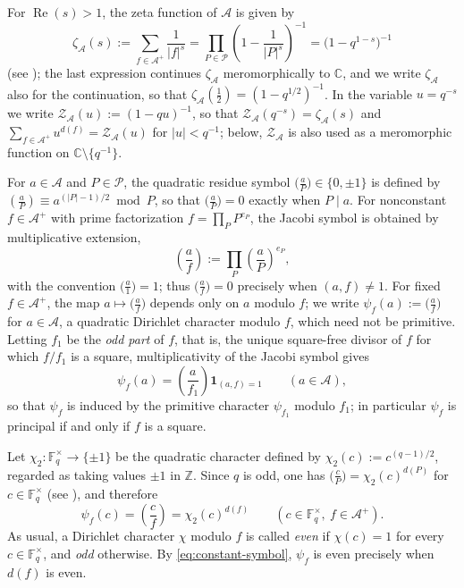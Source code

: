 \documentclass[a4paper,reqno]{amsart}
\numberwithin{equation}{section}
\theoremstyle{remark}
\theoremstyle{definition}
\newcommand{\A}{\mathcal{A}}
\begin{document}
For $\operatorname{Re}(s)>1$, the zeta function of $\A$ is given by
$$
\zeta_{\A}(s):=\sum_{f\in\A^+}\frac{1}{|f|^{s}}
=\prod_{P\in\mathcal P}\left(1-\frac{1}{|P|^{s}}\right)^{-1}
=\bigl(1-q^{1-s}\bigr)^{-1}
$$
(see \cite[Chapter~2]{Ro02}); the last expression continues $\zeta_\A$
meromorphically to $\mathbb C$, and we write $\zeta_\A$ also for the
continuation, so that $\zeta_\A(\tfrac12)=(1-q^{1/2})^{-1}$. In the variable
$u=q^{-s}$ we write $\mathcal Z_{\A}(u):=(1-qu)^{-1}$, so that
$\mathcal Z_{\A}(q^{-s})=\zeta_{\A}(s)$ and
$\sum_{f\in\A^+}u^{d(f)}=\mathcal Z_\A(u)$ for $|u|<q^{-1}$; below,
$\mathcal Z_\A$ is also used as a meromorphic function on
$\mathbb C\setminus\{q^{-1}\}$.

For $a\in\A$ and $P\in\mathcal{P}$, the quadratic residue symbol
$\bigl(\frac{a}{P}\bigr)\in\{0,\pm1\}$ is defined by
$\left(\frac{a}{P}\right)\equiv a^{(|P|-1)/2}\bmod P$,
so that $\bigl(\frac{a}{P}\bigr)=0$ exactly when $P\mid a$. For
nonconstant $f\in\A^+$ with prime factorization $f=\prod_PP^{e_P}$, the
Jacobi symbol is obtained by multiplicative extension,
$$
\left(\frac{a}{f}\right):=\prod_P\left(\frac{a}{P}\right)^{e_P},
$$
with the convention $\bigl(\frac{a}{1}\bigr)=1$; thus
$\bigl(\frac{a}{f}\bigr)=0$ precisely when $(a,f)\ne1$. For fixed
$f\in\A^+$, the map $a\mapsto\bigl(\frac{a}{f}\bigr)$ depends only on
$a$ modulo $f$; we write $\psi_f(a):=\bigl(\frac{a}{f}\bigr)$ for $a\in\A$, a
quadratic Dirichlet character modulo $f$, which need not be primitive.
Letting $f_1$ be the \emph{odd part} of $f$, that is, the unique square-free
divisor of $f$ for which $f/f_1$ is a square, multiplicativity of the Jacobi
symbol gives
\begin{equation}\label{eq:psi-induced}
\psi_f(a)=\left(\frac{a}{f_1}\right)\mathbf 1_{(a,f)=1}
\qquad(a\in\A),
\end{equation}
so that $\psi_f$ is induced by the primitive character $\psi_{f_1}$ modulo
$f_1$; in particular $\psi_f$ is principal if and only if $f$ is a square.

Let $\chi_2:\mathbb F_q^\times\to\{\pm1\}$ be the quadratic character
defined by $\chi_2(c):=c^{(q-1)/2}$, regarded as taking values $\pm1$ in $\mathbb Z$.
Since $q$ is odd, one has $\bigl(\frac{c}{P}\bigr)=\chi_2(c)^{d(P)}$ for
$c\in\mathbb F_q^\times$ (see \cite[Chapter~3]{Ro02}), and therefore
\begin{equation}\label{eq:constant-symbol}
\psi_f(c)=\left(\frac{c}{f}\right)=\chi_2(c)^{d(f)}
\qquad
(c\in\mathbb F_q^\times,\ f\in\A^+).
\end{equation}
As usual, a Dirichlet character $\chi$ modulo $f$ is called \emph{even} if
$\chi(c)=1$ for every $c\in\mathbb F_q^\times$, and \emph{odd} otherwise.
By \eqref{eq:constant-symbol}, $\psi_f$ is even precisely when $d(f)$ is
even.
\end{document}
